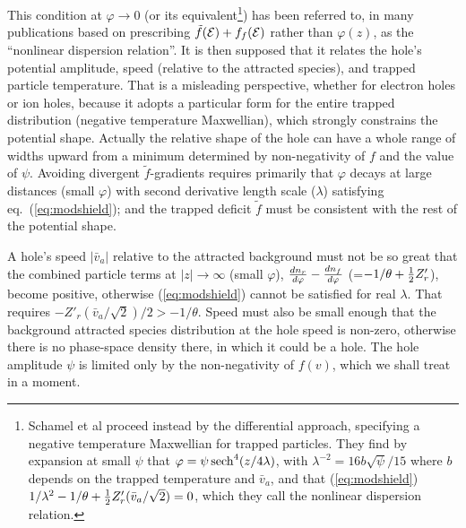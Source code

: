 \documentclass[aip,pop,article-title]{revtex4-2}
\def\energy{{\cal E}}
\def\sech{{\,\rm sech}}
\begin{document}
This condition at $\varphi\to0$ (or its equivalent\footnote{Schamel et al
  proceed instead by the differential approach, specifying a negative
  temperature Maxwellian for trapped particles. They find by expansion
  at small $\psi$ that $\varphi=\psi\sech^4(z/4\lambda)$, with
  $\lambda^{-2}=16b\sqrt{{\psi}}/15$ where $b$ depends on the trapped
  temperature and $\bar v_a$, and that (\ref{eq:modshield})
  $1/\lambda^2-1/\theta+{1 \over 2} Z'_r(\bar v_a/\sqrt{2})=0$, which they
  call the nonlinear dispersion relation. }) has been referred to, in
many publications\cite{Schamel1979} based on prescribing
$\tilde f(\energy)+f_f(\energy)$ rather than $\varphi(z)$, as the
``nonlinear dispersion relation''. It is then supposed that it relates
the hole's potential amplitude, speed (relative to the attracted
species), and trapped particle temperature. That is a misleading
perspective, whether for electron holes or ion holes, because it
adopts a particular form for the entire trapped distribution (negative
temperature Maxwellian), which strongly constrains the potential
shape. Actually the relative shape of the hole can have a whole range
of widths upward from a minimum determined by non-negativity of $f$
and the value of ${\psi}$. Avoiding divergent $\tilde f$-gradients
requires primarily that $\varphi$ decays at large distances (small
$\varphi$) with second derivative length scale ($\lambda$) satisfying
eq.\ (\ref{eq:modshield}); and the trapped deficit $\tilde f$ must be
consistent with the rest of the potential shape.

A hole's speed $|\bar v_a|$ relative to the attracted background must not
be so great that the combined particle terms at $|z|\to \infty$ (small
$\varphi$), ${dn_{r}\over d\varphi }-{dn_{f}\over d\varphi }$
(=$-1/\theta+{1\over2}Z'_r$), become positive, otherwise
(\ref{eq:modshield}) cannot be satisfied for real $\lambda$. That
requires $-Z'_r(\bar v_a/\sqrt{2})/2>-1/\theta$. Speed must also be small
enough that the background attracted species distribution at the hole
speed is non-zero, otherwise there is no phase-space density there, in
which it could be a hole. The hole amplitude ${\psi}$ is limited only
by the non-negativity of $f(v)$, which we shall treat in a moment.
\end{document}
